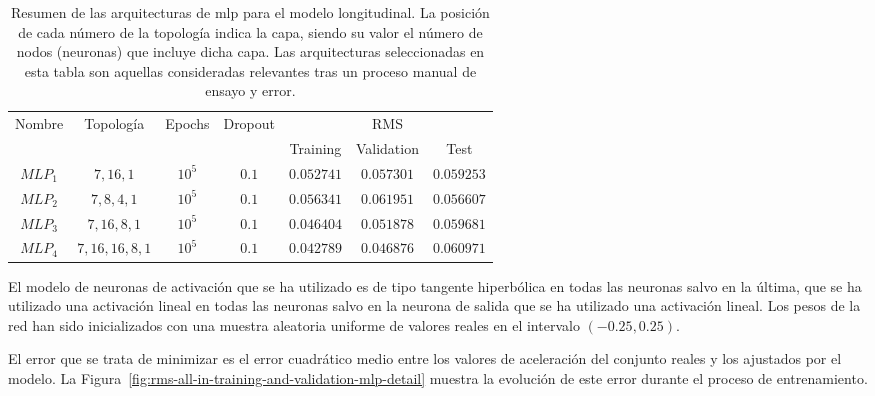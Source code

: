 \begin{table*}
	\caption[Resumen de las arquitecturas \ac{mlp} para el modelo longitudinal]{Resumen de las arquitecturas de \ac{mlp} para el modelo longitudinal. La posición de cada número de la topología indica la capa, siendo su valor el número de nodos (neuronas) que incluye dicha capa. Las arquitecturas seleccionadas en esta tabla son aquellas consideradas relevantes tras un proceso manual de ensayo y error.}
	\label{tbl:cf-mlp-architectures}
	\begin{tabular}{ccccccc}
		\hline
		\multirow{2}{*}{Nombre} & \multirow{2}{*}{Topología} & \multirow{2}{*}{Epochs} & \multirow{2}{*}{Dropout} & \multicolumn{3}{c}{RMS}      \\
		&                            &                         &                          & Training & Validation & Test \\ \hline
		$MLP_1$ & $7, 16, 1$                 & $10^5$                  & $0.1$                    & $0.052741$      & $0.057301$        & $0.059253$  \\
		$MLP_2$ & $7, 8, 4, 1$               & $10^5$                  & $0.1$                    & $0.056341$      & $0.061951$        & $0.056607$  \\
		$MLP_3$ & $7, 16, 8, 1$              & $10^5$                  & $0.1$                    & $0.046404$      & $0.051878$        & $0.059681$  \\
		$MLP_4$ & $7, 16, 16, 8, 1$          & $10^5$                  & $0.1$                    & $0.042789$      & $0.046876$        & $0.060971$  \\ \hline
	\end{tabular}
\end{table*}

El modelo de neuronas de activación que se ha utilizado es de tipo tangente hiperbólica en todas las neuronas salvo en la última, que se ha utilizado una activación lineal en todas las neuronas salvo en la neurona de salida que se ha utilizado una activación lineal. Los pesos de la red han sido inicializados con una muestra aleatoria uniforme de valores reales en el intervalo $(-0.25, 0.25)$.

El error que se trata de minimizar es el error cuadrático medio entre los valores de aceleración del conjunto reales y los ajustados por el modelo. La Figura~\ref{fig:rms-all-in-training-and-validation-mlp-detail} muestra la evolución de este error durante el proceso de entrenamiento.

